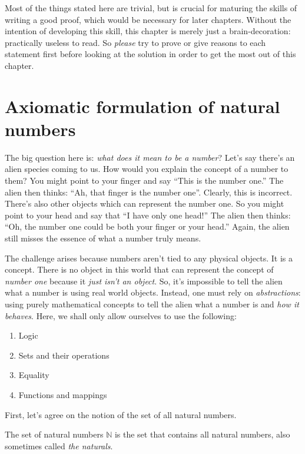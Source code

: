 Most of the things stated here are trivial, but is crucial for maturing the skills of writing a good
proof, which would be necessary for later chapters. Without the intention of developing this skill,
this chapter is merely just a brain-decoration: practically useless to read. So \emph{please} try to
prove or give reasons to each statement first before looking at the solution in order to get the
most out of this chapter.

\section{Axiomatic formulation of natural numbers}

The big question here is: \emph{what does it mean to be a number}? Let's say there's an alien
species coming to us. How would you explain the concept of a number to them? You might point to your
finger and say \enquote{This is the number one.} The alien then thinks:
\enquote{Ah, that finger is the number one}. Clearly, this is incorrect. There's also other objects
which can represent the number one. So you might point to your head and say that
\enquote{I have only one head!} The alien then thinks:
\enquote{Oh, the number one could be both your finger or your head.} Again, the alien still misses
the essence of what a number truly means.

The challenge arises because numbers aren't tied to any physical objects. It is a concept. There is
no object in this world that can represent the concept of \emph{number one} because it
\emph{just isn't an object}. So, it's impossible to tell the alien what a number is
using real world objects. Instead, one must rely on \emph{abstractions}: using purely
mathematical concepts to tell the alien what a number is and \emph{how it behaves}. Here, we shall
only allow ourselves to use the following:
\begin{enumerate}[noitemsep]
  \item Logic
  \item Sets and their operations
  \item Equality
  \item Functions and mappings
\end{enumerate}

First, let's agree on the notion of the set of all natural numbers.
\begin{notation}{The set of natural numbers}{}
  \(\mathbb{N}\) is the set that contains all natural numbers, also sometimes called \emph{the
  naturals}.
\end{notation}


